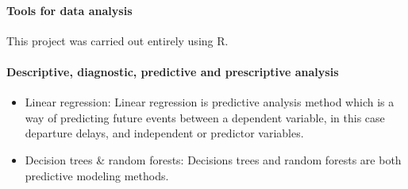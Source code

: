 \documentclass[
]{article}
\providecommand{\tightlist}{%
  \setlength{\itemsep}{0pt}\setlength{\parskip}{0pt}}
\begin{document}
\hypertarget{tools-for-data-analysis}{%
\paragraph{Tools for data analysis}\label{tools-for-data-analysis}}

This project was carried out entirely using R.

\hypertarget{descriptive-diagnostic-predictive-and-prescriptive-analysis}{%
\paragraph{Descriptive, diagnostic, predictive and prescriptive
analysis}\label{descriptive-diagnostic-predictive-and-prescriptive-analysis}}

\begin{itemize}
\tightlist
\item
  Linear regression: Linear regression is predictive analysis method
  which is a way of predicting future events between a dependent
  variable, in this case departure delays, and independent or predictor
  variables.
\item
  Decision trees \& random forests: Decisions trees and random forests
  are both predictive modeling methods.
\end{itemize}
\end{document}
